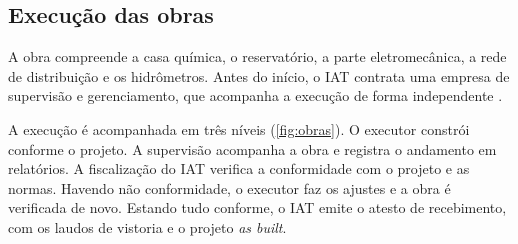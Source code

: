 
\FloatBarrier
\subsection{Execução das obras}
\label{subsec:obras}

A obra compreende a casa química, o reservatório, a parte eletromecânica, a
rede de distribuição e os hidrômetros. Antes do início, o IAT contrata uma
empresa de supervisão e gerenciamento, que acompanha a execução de forma
independente \cite{mop2026}.

A execução é acompanhada em três níveis (\autoref{fig:obras}). O executor
constrói conforme o projeto. A supervisão acompanha a obra e registra o
andamento em relatórios. A fiscalização do IAT verifica a conformidade com o
projeto e as normas. Havendo não conformidade, o executor faz os ajustes e a
obra é verificada de novo. Estando tudo conforme, o IAT emite o atesto de
recebimento, com os laudos de vistoria e o projeto \textit{as built}.

